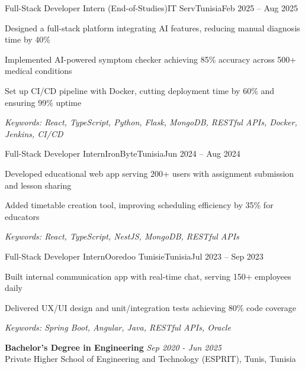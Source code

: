 \documentclass[11pt,a4paper]{article}
\begin{document}
\makecvheader
\makecontactinfo


\begin{internship}{Full-Stack Developer Intern (End-of-Studies)}{IT Serv}{Tunisia}{Feb 2025 -- Aug 2025}{}
  \item Designed a full-stack platform integrating AI features, reducing manual diagnosis time by 40\%
  \item Implemented AI-powered symptom checker achieving 85\% accuracy across 500+ medical conditions
  \item Set up CI/CD pipeline with Docker, cutting deployment time by 60\% and ensuring 99\% uptime
  \item[] \textit{\footnotesize Keywords: React, TypeScript, Python, Flask, MongoDB, RESTful APIs, Docker, Jenkins, CI/CD}
\end{internship}

\begin{internship}{Full-Stack Developer Intern}{IronByte}{Tunisia}{Jun 2024 -- Aug 2024}{}
  \item Developed educational web app serving 200+ users with assignment submission and lesson sharing
  \item Added timetable creation tool, improving scheduling efficiency by 35\% for educators
  \item[] \textit{\footnotesize Keywords: React, TypeScript, NestJS, MongoDB, RESTful APIs}
\end{internship}

\begin{internship}{Full-Stack Developer Intern}{Ooredoo Tunisie}{Tunisia}{Jul 2023 -- Sep 2023}{}
  \item Built internal communication app with real-time chat, serving 150+ employees daily
  \item Delivered UX/UI design and unit/integration tests achieving 80\% code coverage
  \item[] \textit{\footnotesize Keywords: Spring Boot, Angular, Java, RESTful APIs, Oracle}
\end{internship}

\textbf{Bachelor's Degree in Engineering} \hfill \textit{Sep 2020 - Jun 2025}\\[-2pt]
Private Higher School of Engineering and Technology (ESPRIT), Tunis, Tunisia
\end{document}
